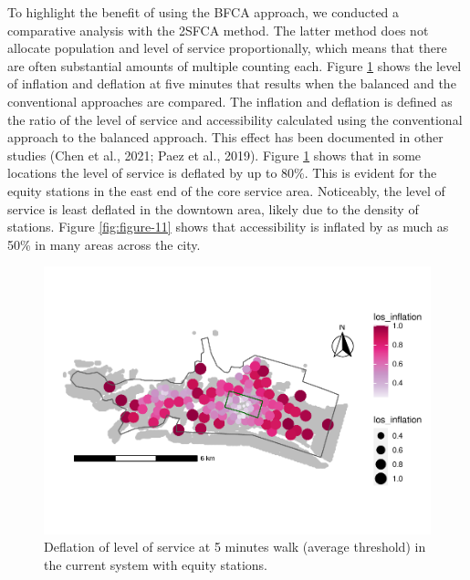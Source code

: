 \documentclass[]{elsarticle} %
\begin{document}
To highlight the benefit of using the BFCA approach, we conducted a
comparative analysis with the 2SFCA method. The latter method does not
allocate population and level of service proportionally, which means
that there are often substantial amounts of multiple counting each.
Figure \ref{fig:figure-10} shows the level of inflation and deflation at
five minutes that results when the balanced and the conventional
approaches are compared. The inflation and deflation is defined as the
ratio of the level of service and accessibility calculated using the
conventional approach to the balanced approach. This effect has been
documented in other studies (Chen et al., 2021; Paez et al., 2019).
Figure \ref{fig:figure-10} shows that in some locations the level of
service is deflated by up to 80\%. This is evident for the equity
stations in the east end of the core service area. Noticeably, the level
of service is least deflated in the downtown area, likely due to the
density of stations. Figure \ref{fig:figure-11} shows that accessibility
is inflated by as much as 50\% in many areas across the city.

\begin{figure}

{\centering \includegraphics[width=0.9\linewidth]{Bike-share-spatial-equity_files/figure-latex/figure-10-1} 

}

\caption{Deflation of level of service at 5 minutes walk (average threshold) in the current system with equity stations.}\label{fig:figure-10}
\end{figure}
\end{document}
